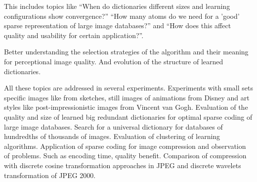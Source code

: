 This includes topics like ``When do dictionaries different sizes and
learning configurations show convergence?'' ``How many atoms do we need for a
'good' sparse representation of large image databases?''  and ``How does this
affect quality and usability for certain application?''. 

Better understanding the selection strategies of the algorithm and their
meaning for perceptional image quality. And evolution of the structure of
learned dictionaries. 

All these topics are addressed in several experiments. Experiments with
small sets specific images like from sketches, still images of animations from
Disney and art styles like post-impressionistic images from Vincent van Gogh.
Evaluation of the quality and size of learned big redundant dictionaries for
optimal sparse coding of large image databases. Search for a universal
dictionary for databases of hundredths of thousands of images. Evaluation of
clustering of learning algorithms. Application of sparse coding for image
compression and observation of problems. Such as encoding time, quality benefit.
Comparison of compression with discrete cosine transformation approaches in JPEG
and discrete wavelets transformation of JPEG 2000.





